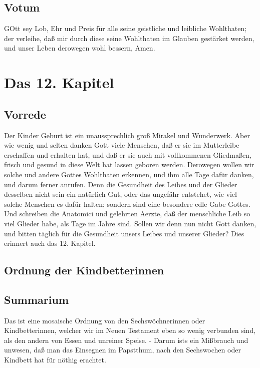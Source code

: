 \section{Votum}

GOtt sey Lob, Ehr und Preis für alle seine geistliche und leibliche Wohlthaten;
der verleihe, daß mir durch diese seine Wohlthaten im Glauben gestärket werden, und unser Leben derowegen wohl bessern, Amen.

\chapter{Das 12. Kapitel}

\section{Vorrede}

Der Kinder Geburt ist ein unaussprechlich groß Mirakel und Wunderwerk. Aber wie wenig und selten danken Gott viele Menschen, daß er sie im Mutterleibe erschaffen und erhalten hat, und daß er sie auch mit vollkommenen Gliedmaßen, frisch und gesund in diese Welt hat lassen geboren werden. Derowegen wollen wir solche und andere Gottes Wohlthaten erkennen, und ihm alle Tage dafür danken, und darum ferner anrufen. Denn die Gesundheit des Leibes und der Glieder desselben nicht sein ein natürlich Gut, oder das ungefähr entstehet, wie viel solche Menschen es dafür halten; sondern sind eine besondere edle Gabe Gottes. Und schreiben die Anatomici und gelehrten Aerzte, daß der menschliche Leib so viel Glieder habe, als Tage im Jahre sind. Sollen wir denn nun nicht Gott danken, und bitten täglich für die Gesundheit unsers Leibes und unserer Glieder? Dies erinnert auch das 12. Kapitel.

\section{Ordnung der Kindbetterinnen}

\section{Summarium}

Das ist eine mosaische Ordnung von den Sechswöchnerinnen oder Kindbetterinnen, welcher wir im Neuen Testament eben so wenig verbunden sind, als den andern von Essen und unreiner Speise. - Darum ists ein Mißbrauch und unwesen, daß man das Einsegnen im Papstthum, nach den Sechswochen oder Kindbett hat für nöthig erachtet.

